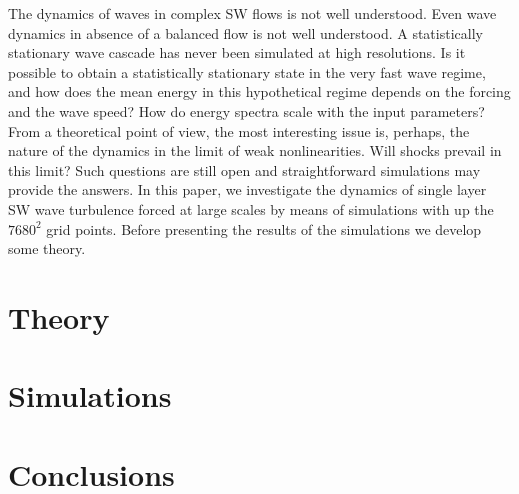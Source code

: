 \documentclass{jfm}
\begin{document}
The dynamics of waves in complex SW flows is not well
understood.  Even wave dynamics in absence of a balanced flow is not well
understood. A statistically stationary wave cascade has never been
simulated at high resolutions.
%
Is it possible to obtain a statistically stationary state in the very
fast wave regime, and how does the mean energy in this hypothetical
regime depends on the forcing and the wave speed?  
How do energy spectra scale with the 
input parameters? From a theoretical point of view, the most interesting issue is, perhaps,  the nature of the dynamics in the limit of weak nonlinearities. Will shocks prevail in this limit?
%
Such questions are still open and straightforward simulations may
provide the answers.
In this paper, we investigate the dynamics of single layer SW wave turbulence 
forced  at large scales by means of 
simulations with up the  $7680^2$ grid points.
%
Before presenting the results of the simulations we develop some theory.
%


\section{Theory}
\label{section_basic_theory}



\label{section_advanced_theory}


\section{Simulations}
\label{section_methods}



%

%



\section{Conclusions}
\end{document}
